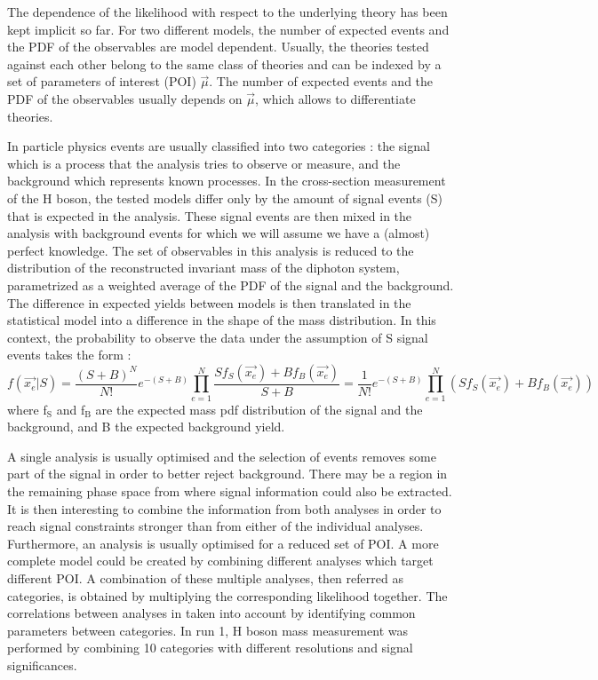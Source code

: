 The dependence of the likelihood with respect to the underlying theory has been kept implicit so far.
For two different models, the number of expected events and the PDF of the observables are model dependent.
Usually, the  theories tested against each other belong to the same class of theories and can be indexed by a set of parameters of interest (POI) \(\vec{\mu}\).
The number of expected events and the PDF of the observables usually depends on \(\vec{\mu}\), which allows to differentiate theories.

In particle physics events are usually classified into two categories : the signal which is a process that the analysis tries to observe or measure, and the background which represents known processes.
In the cross-section measurement of the H boson, the tested models differ only by the amount of signal events (S) that is expected in the analysis.
These signal events are then mixed in the analysis with background events for which we will assume we have a (almost) perfect knowledge.
The set of observables in this analysis is reduced to the distribution of the reconstructed invariant mass of the diphoton system, parametrized as a weighted average of the PDF of the signal and the background.
The difference in expected yields between models is then translated in the statistical model into a difference in the shape of the mass distribution.
In this context, the probability to observe the data under the assumption of S signal events takes the form :
\begin{equation}
f({\vec{x_e}} | S) = \frac{(S+B)^N}{N!}e^{-(S+B)} \prod\limits_{e=1}^{N} \frac{S f_S(\vec{x_e}) + Bf_B(\vec{x_e})}{S+B}
= \frac{1}{N!}e^{-(S+B)} \prod\limits_{e=1}^{N} (S f_S(\vec{x_e}) + Bf_B(\vec{x_e}))
\end{equation}
where f\(_{\text{S}}\) and f\(_{\text{B}}\) are the expected mass pdf distribution of the signal and the background, and B the expected background yield.

A single analysis is usually optimised and the selection of events removes some part of the signal in order to better reject background.
There may be a region in the remaining phase space from where signal information could also be extracted.
It is then interesting to combine the information from both analyses in order to reach signal constraints stronger than from either of the individual analyses.
Furthermore, an analysis is usually optimised for a reduced set of POI.
A more complete model could be created by combining different analyses which target different POI.
A combination of these multiple analyses, then referred as categories, is obtained by multiplying the corresponding likelihood together.
The correlations between analyses in taken into account by identifying common parameters between categories.
In run 1, H boson mass measurement was performed by combining 10 categories with different resolutions and signal significances.

